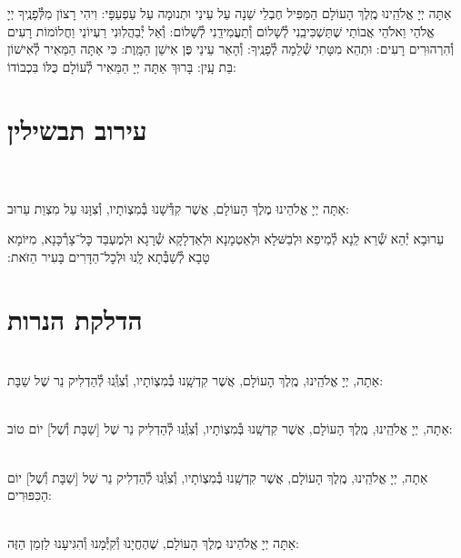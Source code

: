 \documentclass[twoside, openany, parskip=half, 11pt]{book}
\begin{document}
אַתָּה יְיָ אֱלֹהֵֽינוּ מֶֽלֶךְ הָעוֹלָם הַמַּפִּיל חֶבְלֵי שֵׁנָה עַל עֵינַי וּתְנוּמָה עַל עַפְעַפָּי: וִיהִי רָצוֹן מִלְּ֯פָנֶֽיךָ יְיָ אֱלֹהַי וֵאלֹהֵי אֲבוֹתַי שֶׁתַּשְׁכִּיבֵֽנִי לְ֯שָׁלוֹם וְ֯תַעֲמִידֵֽנִי לְ֯שָׁלוֹם: וְ֯אַל יְ֯בַהֲלֽוּנִי רַעְיוֹנַי וַחֲלוֹמוֹת רָעִים וְ֯הִרְהוּרִים רָעִים: וּתְהֵא מִטָּתִי שְׁ֯לֵמָה לְ֯פָנֶֽיךָ: וְ֯הָאֵר עֵינַי פֶּן אִישַׁן הַמָּֽוֶת: כִּי אַתָּה הַמֵּאִיר לְ֯אִישׁוֹן בַּת עָֽיִן: בָּרוּךְ אַתָּה יְיָ הַמֵּאִיר לְ֯עוֹלָם כֻּלּוֹ בִּכְבוֹדוֹ:


\chapter[עירוב תבשילין]{ עירוב תבשילין }

\\
\\
אַתָּה יְיָ אֱלֹהֵינוּ מֶלֶךְ הָעוֹלָם, אֲשֶׁר קִדְּ֯שָׁנוּ בְּ֯מִצְוֹתָיו, וְ֯צִוָּנוּ עַל מִצְוַת עֵרוּב:

עֵרוּבָא יְ֯הֵא שְׁ֯רֵא לַֽנָא לְ֯מֵיפֵא וּלְבַשּּׁלָא וּלְאַטְמָנָא וּלְאַדְלָקָא שְׁ֯רָגָא וּלְמֶעְבַּד כׇּל־צָרְ֯כָּנָא, מִיּוֹמָא טָבָא לְ֯שַׁבְּ֯תָא לָֽנוּ וּלְכׇל־הַדָּרִים בָּעִיר הַזּׂאת:‏


\vspace{\baselineskip}
{\let\clearpage\relax
\chapter[הדלקת הנרות שבת ויום טוב]{ הדלקת הנרות }}

\\
אַתָה, יְיָ אֱלֹהֵֽינוּ, מֶֽלֶךְ הָעוֹלָם, אֲשֶׁר קִדְשָֽׁנוּ בְּ֯מִצְוֹתָיו, וְ֯צִוְּֽ֯נוּ לְ֯הַדְלִיק נֵר שֶׁל שַׁבָּת:

\\
אַתָה, יְיָ אֱלֹהֵֽינוּ, מֶֽלֶךְ הָעוֹלָם, אֲשֶׁר קִדְשָֽׁנוּ בְּ֯מִצְוֹתָיו, וְ֯צִוְּֽ֯נוּ לְ֯הַדְלִיק נֵר שֶׁל
[שַׁבָּת וְ֯שֶׁל] יוֹם טוֹב:

\\
אַתָה, יְיָ אֱלֹהֵֽינוּ, מֶֽלֶךְ הָעוֹלָם, אֲשֶׁר קִדְשָֽׁנוּ בְּ֯מִצְוֹתָיו, וְ֯צִוְּֽ֯נוּ לְ֯הַדְלִיק נֵר שֶׁל
[שַׁבָּת וְ֯שֶׁל] יוֹם הַכִּפּוּרִים:

\\
אַתָּה יְיָ אֱלֹהֵינוּ מֶלֶךְ הָעוֹלָם, שֶׁהֶחֱיָנוּ וְ֯קִיְּ֯מָנוּ וְ֯הִגִּיעָנוּ לַזְמַן הַזֶּה:
\end{document}
